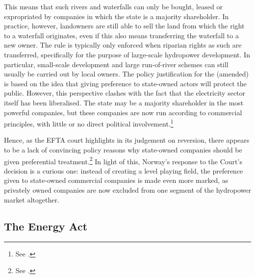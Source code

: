 This means that such rivers and waterfalls can only be bought, leased or expropriated by companies in which the state is a majority shareholder. In practice, however, landowners are still able to sell the land from which the right to a waterfall originates, even if this also means transferring the waterfall to a new owner. The rule is typically only enforced when riparian rights as such are transferred, specifically for the purpose of large-scale hydropower development. In particular, small-scale development and large run-of-river schemes can still usually be carried out by local owners. The policy justification for the (amended) \cite{ica17} is based on the idea that giving preference to state-owned actors will protect the public. However, this perspective clashes with the fact that the electricity sector itself has been liberalised. The state may be a majority shareholder in the most powerful companies, but these companies are now run according to commercial principles, with little or no direct political involvement.\footnote{See \cite[86]{efta07}.}

Hence, as the EFTA court highlights in its judgement on reversion, there appears to be a lack of convincing policy reasons why state-owned companies should be given preferential treatment.\footnote{See \cite[84-87]{efta07}.} In light of this, Norway's response to the Court's decision is a curious one: instead of creating a level playing field, the preference given to state-owned commercial companies is made even more marked, as privately owned companies are now excluded from one segment of the hydropower market altogether.


\subsection{The Energy Act}\label{sec:ea}

